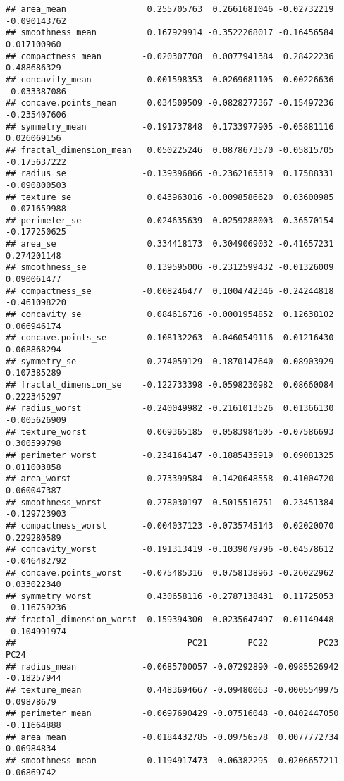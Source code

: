 \documentclass[
]{article}
\begin{document}
\begin{verbatim}
## area_mean                0.255705763  0.2661681046 -0.02732219 -0.090143762
## smoothness_mean          0.167929914 -0.3522268017 -0.16456584  0.017100960
## compactness_mean        -0.020307708  0.0077941384  0.28422236  0.488686329
## concavity_mean          -0.001598353 -0.0269681105  0.00226636 -0.033387086
## concave.points_mean      0.034509509 -0.0828277367 -0.15497236 -0.235407606
## symmetry_mean           -0.191737848  0.1733977905 -0.05881116  0.026069156
## fractal_dimension_mean   0.050225246  0.0878673570 -0.05815705 -0.175637222
## radius_se               -0.139396866 -0.2362165319  0.17588331 -0.090800503
## texture_se               0.043963016 -0.0098586620  0.03600985 -0.071659988
## perimeter_se            -0.024635639 -0.0259288003  0.36570154 -0.177250625
## area_se                  0.334418173  0.3049069032 -0.41657231  0.274201148
## smoothness_se            0.139595006 -0.2312599432 -0.01326009  0.090061477
## compactness_se          -0.008246477  0.1004742346 -0.24244818 -0.461098220
## concavity_se             0.084616716 -0.0001954852  0.12638102  0.066946174
## concave.points_se        0.108132263  0.0460549116 -0.01216430  0.068868294
## symmetry_se             -0.274059129  0.1870147640 -0.08903929  0.107385289
## fractal_dimension_se    -0.122733398 -0.0598230982  0.08660084  0.222345297
## radius_worst            -0.240049982 -0.2161013526  0.01366130 -0.005626909
## texture_worst            0.069365185  0.0583984505 -0.07586693  0.300599798
## perimeter_worst         -0.234164147 -0.1885435919  0.09081325  0.011003858
## area_worst              -0.273399584 -0.1420648558 -0.41004720  0.060047387
## smoothness_worst        -0.278030197  0.5015516751  0.23451384 -0.129723903
## compactness_worst       -0.004037123 -0.0735745143  0.02020070  0.229280589
## concavity_worst         -0.191313419 -0.1039079796 -0.04578612 -0.046482792
## concave.points_worst    -0.075485316  0.0758138963 -0.26022962  0.033022340
## symmetry_worst           0.430658116 -0.2787138431  0.11725053 -0.116759236
## fractal_dimension_worst  0.159394300  0.0235647497 -0.01149448 -0.104991974
##                                  PC21        PC22          PC23        PC24
## radius_mean             -0.0685700057 -0.07292890 -0.0985526942 -0.18257944
## texture_mean             0.4483694667 -0.09480063 -0.0005549975  0.09878679
## perimeter_mean          -0.0697690429 -0.07516048 -0.0402447050 -0.11664888
## area_mean               -0.0184432785 -0.09756578  0.0077772734  0.06984834
## smoothness_mean         -0.1194917473 -0.06382295 -0.0206657211  0.06869742

\end{verbatim}
\end{document}
